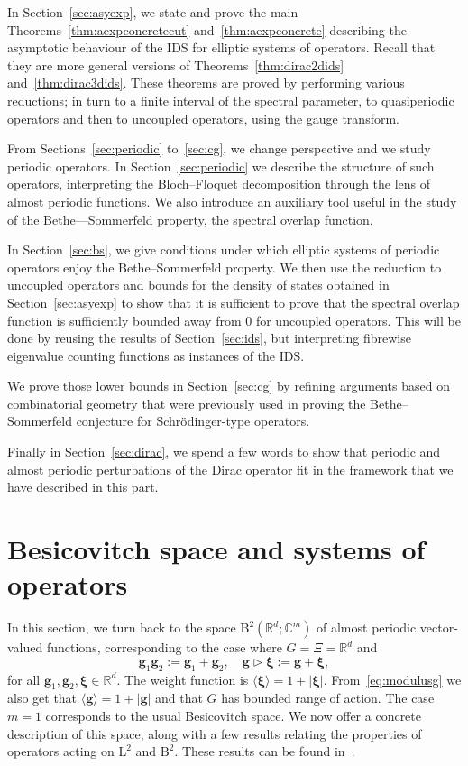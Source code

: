 \documentclass[10pt]{amsart}
\theoremstyle{definition}\newtheorem{defi}[theo]{Definition}\newtheorem{rema}[theo]{Remark}\newtheorem{exam}[theo]{Example}\newtheorem{nota}[theo]{Notation}
\newcommand{\RB}{\mathrm{B}}
\newcommand{\RL}{\mathrm{L}}
\newcommand{\R}{\mathbb R}
\newcommand{\C}{\mathbb C}
\newcommand{\bxi}{\boldsymbol \xi}
\newcommand{\bg}{\mathbf g}
\newcommand{\act}{\triangleright}
\newcommand{\abs}[1]{\left\lvert #1 \right\rvert}
\newcommand{\ang}[1]{\langle #1 \rangle}
\begin{document}
In Section~\ref{sec:asyexp}, we state and prove the main Theorems~\ref{thm:aexpconcretecut} and~\ref{thm:aexpconcrete} describing the asymptotic behaviour of the IDS for elliptic
systems of operators. Recall that they are more general versions of Theorems~\ref{thm:dirac2dids} and~\ref{thm:dirac3dids}. These theorems are proved by performing various reductions; in turn to a finite interval of the spectral parameter, to quasiperiodic operators and then to uncoupled operators, using the gauge transform.
 
From Sections~\ref{sec:periodic} to~\ref{sec:cg}, we change perspective and we study periodic operators. In Section~\ref{sec:periodic} we describe the structure of such operators, interpreting the Bloch--Floquet decomposition through the lens of almost periodic functions. We also introduce an auxiliary tool useful in the study of the Bethe—Sommerfeld property, the spectral overlap function.
 
In Section~\ref{sec:bs}, we give conditions under which elliptic systems of periodic operators enjoy the Bethe–Sommerfeld property. We then use the reduction to uncoupled operators and bounds for the density of states obtained in Section~\ref{sec:asyexp} to show that it is sufficient to prove that the spectral overlap function is sufficiently bounded away from 0 for uncoupled operators. This will be done by reusing the results of Section~\ref{sec:ids}, but interpreting fibrewise eigenvalue counting functions as instances of the IDS.
 
We prove those lower bounds in Section~\ref{sec:cg} by refining arguments based on combinatorial geometry that were previously used in proving the Bethe–Sommerfeld conjecture for Schr\"odinger-type operators.


Finally in Section~\ref{sec:dirac}, we spend a few words to show that periodic and almost periodic perturbations of the Dirac operator fit in the framework that we have described in this part.


\section{Besicovitch space and systems of operators} \label{sec:besicovitch}

In this section, we turn back to the space $\RB^2(\R^d;\C^m)$ of almost periodic vector-valued functions, corresponding to the case where $G = \Xi = \R^d$ and
\begin{equation}
\bg_1\bg_2:=\bg_1+\bg_2, \quad \bg\act\bxi:=\bg+\bxi,
\end{equation}
for all $\bg_1,\bg_2,\bxi\in\R^d$. The weight function is $\ang \bxi = 1 + \abs \bxi$. From~\eqref{eq:modulusg} we also get that $\ang \bg = 1 + \abs
\bg$ and that $G$ has bounded range of action. The case $m = 1$ corresponds to the usual Besicovitch space. We now offer a concrete description of this space, along with a few results relating the properties of operators acting on $\RL^2$ and $\RB^2$. These results can be found in~\cite{CoburnMoyerSinger,Shubin1978,Shubin1979}.
\end{document}
